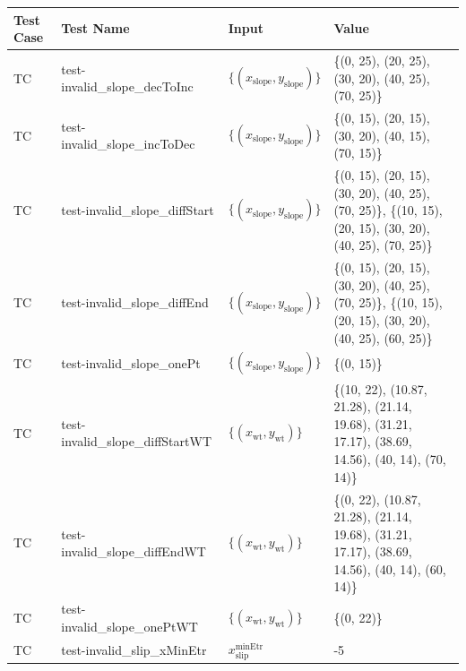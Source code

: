 \documentclass[12pt, titlepage]{article}
\newcounter{testnum} %
\begin{document}
\begin{longtable}{  l  p{5cm}  l  p{5cm}  }
	\hline
	\textbf{Test Case} & \textbf{Test Name} & \textbf{Input} & \textbf{Value} \\
	\hline
	TC{testnum}\thetestnum \label{TC_InvalidSlopeDecToInc} & 
	test-invalid\_slope\_decToInc & 
	$\{\left(x_\text{slope},y_\text{slope}\right)\}$ & \{(0, 25), (20, 25), 
	(30, 20), 
	(40, 25), 
	(70, 25)\}\\ 
	\hline
	TC{testnum}\thetestnum \label{TC_InvalidSlopeIncToDec} & 
	test-invalid\_slope\_incToDec & 
	$\{\left(x_\text{slope},y_\text{slope}\right)\}$ & \{(0, 15), (20, 15), 
	(30, 20), 
	(40, 15), 
	(70, 15)\}\\ 
	\hline
	TC{testnum}\thetestnum \label{TC_InvalidSlopeDiffStart} & 
	test-invalid\_slope\_diffStart & 
	$\{\left(x_\text{slope},y_\text{slope}\right)\}$ & \{(0, 15), (20, 15), 
	(30, 20), 
	(40, 25), 
	(70, 25)\}, \{(10, 15), (20, 15), (30, 20), (40, 25), (70, 25)\}\\ 
	\hline
	TC{testnum}\thetestnum \label{TC_InvalidSlopeDiffEnd} & 
	test-invalid\_slope\_diffEnd & 
	$\{\left(x_\text{slope},y_\text{slope}\right)\}$ & \{(0, 15), (20, 15), 
	(30, 20), 
	(40, 25), 
	(70, 25)\}, \{(10, 15), (20, 15), (30, 20), (40, 25), (60, 25)\}\\ 
	\hline
	TC{testnum}\thetestnum \label{TC_InvalidSlopeOnePt} & 
	test-invalid\_slope\_onePt & 
	$\{\left(x_\text{slope},y_\text{slope}\right)\}$ & \{(0, 15)\}\\ 
	\hline
	TC{testnum}\thetestnum \label{TC_InvalidSlopeDiffStartWT} & 
	test-invalid\_slope\_diffStartWT & 
	$\{\left(x_\text{wt},y_\text{wt}\right)\}$ & \{(10, 22), (10.87, 21.28), 
	(21.14, 
	19.68), (31.21, 17.17), (38.69, 14.56), (40, 14), (70, 14)\}\\ 
	\hline
	TC{testnum}\thetestnum \label{TC_InvalidSlopeDiffEndWT} & 
	test-invalid\_slope\_diffEndWT & 
	$\{\left(x_\text{wt},y_\text{wt}\right)\}$ & \{(0, 22), (10.87, 21.28), 
	(21.14, 
	19.68), (31.21, 17.17), (38.69, 14.56), (40, 14), (60, 14)\}\\ 
	\hline
	TC{testnum}\thetestnum \label{TC_InvalidSlopeOnePtWT} & 
	test-invalid\_slope\_onePtWT & 
	$\{\left(x_\text{wt},y_\text{wt}\right)\}$ & \{(0, 22)\}\\ 
	\hline
	TC{testnum}\thetestnum \label{TC_InvalidSlipXMinEtr} & 
	test-invalid\_slip\_xMinEtr & ${x_\text{slip}^\text{minEtr}}$ & -5\\ 

\end{longtable}
\end{document}
